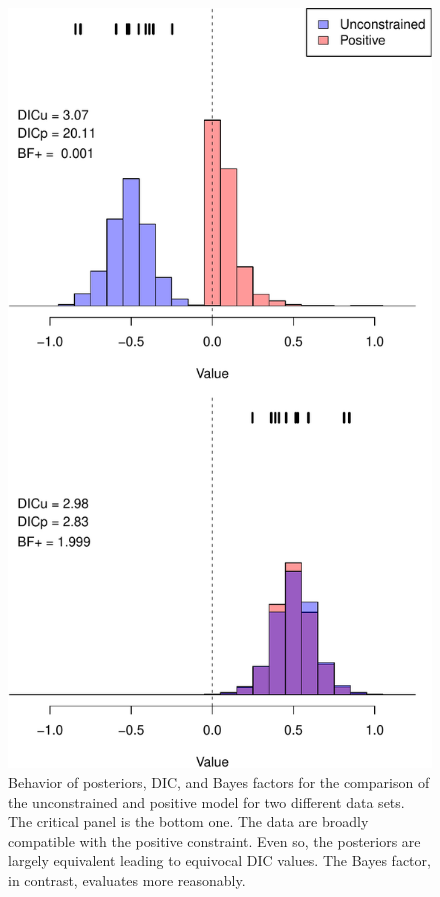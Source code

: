 \documentclass[english,man]{apa6}
\theoremstyle{definition}
\theoremstyle{definition}
\theoremstyle{remark}
\begin{document}
\begin{figure}[htbp]
\centering
\includegraphics{p_files/figure-latex/dic-1.pdf}
\caption{\label{fig:dic}Behavior of posteriors, DIC, and Bayes factors for
the comparison of the unconstrained and positive model for two different
data sets. The critical panel is the bottom one. The data are broadly
compatible with the positive constraint. Even so, the posteriors are
largely equivalent leading to equivocal DIC values. The Bayes factor, in
contrast, evaluates more reasonably.}
\end{figure}
\end{document}
